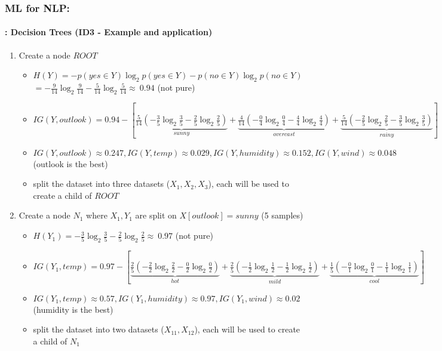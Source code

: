 \documentclass[xcolor=table]{beamer}
\begin{document}
	\begin{frame}
		\frametitle{ML for NLP: \insertsection}
		\framesubtitle{\insertsubsection: Decision Trees (ID3 - Example and application)}
		\tiny
		\begin{enumerate}
			\item Create a node $ ROOT $
			\begin{itemize}\tiny\bfseries
				\item $ H(Y) = - p(yes \in Y) \log_2 p(yes\in Y) - p(no \in Y) \log_2 p(no\in Y)  $
				$ = -\frac{9}{14} \log_2 \frac{9}{14} - \frac{5}{14} \log_2 \frac{5}{14} \approx\ 0.94$ (not pure)
				\item $ IG(Y, outlook) = 0.94 - [ \underbrace{\frac{5}{14} (- \frac{3}{5} \log_2 \frac{3}{5} - \frac{2}{5} \log_2 \frac{2}{5} )}_{sunny} + \underbrace{\frac{4}{14} (- \frac{0}{4} \log_2 \frac{0}{4} - \frac{4}{4} \log_2 \frac{4}{4})}_{overcast} +  \underbrace{\frac{5}{14} (- \frac{2}{5} \log_2 \frac{2}{5} - \frac{3}{5} \log_2 \frac{3}{5})}_{rainy} ]$
				\item $ IG(Y, outlook) \approx 0.247 , IG(Y, temp) \approx 0.029 , IG(Y, humidity) \approx 0.152 ,  IG(Y, wind) \approx 0.048 $ (outlook is the best)
				\item split the dataset into three datasets ($ X_1, X_2, X_3 $), each will be used to create a child of $ ROOT $
			\end{itemize}
		
			\item Create a node $ N_1 $ where $ X_1, Y_1 $ are split on $ X[outlook] = sunny$ (5 samples)
			\begin{itemize}\tiny\bfseries
				\item $ H(Y_1) = - \frac{3}{5} \log_2 \frac{3}{5} - \frac{2}{5} \log_2 \frac{2}{5} \approx\ 0.97$ (not pure)
				\item $ IG(Y_1, temp) = 0.97 - [ \underbrace{\frac{2}{5} (- \frac{2}{2} \log_2 \frac{2}{2} - \frac{0}{2} \log_2 \frac{0}{2} )}_{hot} + \underbrace{\frac{2}{5} (- \frac{1}{2} \log_2 \frac{1}{2} - \frac{1}{2} \log_2 \frac{1}{2})}_{mild} +  \underbrace{\frac{1}{5} (- \frac{0}{1} \log_2 \frac{0}{1} - \frac{1}{1} \log_2 \frac{1}{1})}_{cool} ]$
				\item $ IG(Y_1, temp) \approx 0.57 , IG(Y_1, humidity) \approx 0.97 ,  IG(Y_1, wind) \approx 0.02 $ (humidity is the best)
				\item split the dataset into two datasets ($ X_{11}, X_{12}$), each will be used to create a child of $ N_1 $
			\end{itemize}
		

\end{enumerate}
\end{frame}
\end{document}
